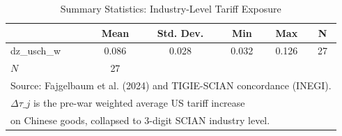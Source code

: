 \begin{table}[htbp]\centering
\def\sym#1{\ifmmode^{#1}\else\(^{#1}\)\fi}
\caption{Summary Statistics: Industry-Level Tariff Exposure}
\begin{tabular}{l*{1}{ccccc}}
\hline\hline
            &        Mean&   Std. Dev.&         Min&         Max&           N\\
\hline
dz\_usch\_w   &       0.086&       0.028&       0.032&       0.126&          27\\
\hline
\(N\)       &          27&            &            &            &            \\
\hline\hline
\multicolumn{6}{l}{\footnotesize Source: Fajgelbaum et al. (2024) and TIGIE-SCIAN concordance (INEGI).}\\
\multicolumn{6}{l}{\footnotesize $\Delta\tau\_j$ is the pre-war weighted average US tariff increase}\\
\multicolumn{6}{l}{\footnotesize on Chinese goods, collapsed to 3-digit SCIAN industry level.}\\
\end{tabular}
\end{table}
